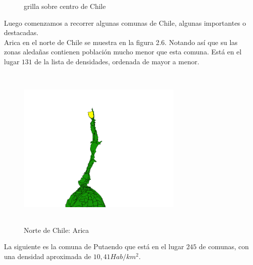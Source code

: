 \documentclass[20pt]{report}
\begin{document}
\begin{itemize}
\begin{figure}[H]
\begin{center}
\vspace{-0.5cm} %
\caption{grilla sobre centro de Chile}
\label{Label para referencia}
\end{center}
\end{figure}
\pagebreak
Luego comenzamos a recorrer algunas comunas  de Chile, algunas importantes o destacadas.\\
Arica en el norte de Chile se muestra en la figura 2.6. Notando as\'i que su las zonas aleda\~nas contienen poblaci\'on mucho menor que esta comuna. Est\'a en el lugar $131$ de la lista de densidades, ordenada de mayor a menor.
\begin{figure}[H]
\begin{center}
\includegraphics[width=8cm, height=8cm]{arica133.png}
\vspace{-0.5cm} %
\caption{Norte de Chile: Arica}
\label{Label para referencia}
\end{center}
\end{figure}
La siguiente es la comuna de Putaendo que est\'a en el lugar $245$ de comunas, con una densidad aproximada de $10,41 Hab/km^2$.



\end{itemize}
\end{document}
